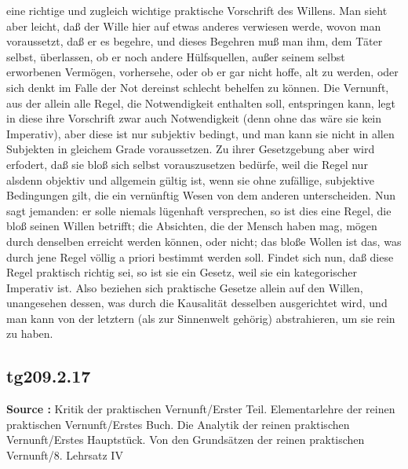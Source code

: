 \documentclass[a4paper,12pt,twoside]{book}
\begin{document}
eine richtige und zugleich wichtige praktische Vorschrift des Willens. Man sieht aber leicht, daß der Wille hier auf etwas anderes verwiesen werde, wovon man voraussetzt, daß er es begehre, und dieses Begehren muß man ihm, dem Täter selbst, überlassen, ob er noch andere Hülfsquellen, außer seinem selbst erworbenen Vermögen, vorhersehe, oder ob er gar nicht hoffe, alt zu werden, oder sich denkt im Falle der Not dereinst schlecht behelfen zu können. Die Vernunft, aus der allein alle Regel, die Notwendigkeit enthalten soll, entspringen kann, legt in diese ihre Vorschrift zwar auch Notwendigkeit (denn ohne das wäre sie kein Imperativ), aber diese ist nur subjektiv bedingt, und man kann sie nicht in allen Subjekten in gleichem Grade voraussetzen. Zu ihrer Gesetzgebung aber wird erfodert, daß sie bloß sich selbst vorauszusetzen bedürfe, weil die Regel nur alsdenn objektiv und allgemein gültig ist, wenn sie ohne zufällige, subjektive Bedingungen gilt, die ein vernünftig Wesen von dem anderen unterscheiden. Nun sagt jemanden: er solle niemals lügenhaft versprechen, so ist dies eine Regel, die bloß seinen Willen betrifft; die Absichten, die der Mensch haben mag, mögen durch denselben erreicht werden können, oder nicht; das bloße Wollen ist das, was durch jene Regel völlig a priori bestimmt werden soll. Findet sich nun, daß diese Regel praktisch richtig sei, so ist sie ein Gesetz, weil sie ein kategorischer Imperativ ist. Also beziehen sich praktische Gesetze allein auf den Willen, unangesehen dessen, was durch die Kausalität desselben ausgerichtet wird, und man kann von der letztern (als zur Sinnenwelt gehörig) abstrahieren, um sie rein zu haben. 
	
	\subsection*{tg209.2.17} 
	\textbf{Source : }Kritik der praktischen Vernunft/Erster Teil. Elementarlehre der reinen praktischen Vernunft/Erstes Buch. Die Analytik der reinen praktischen Vernunft/Erstes Hauptstück. Von den Grundsätzen der reinen praktischen Vernunft/8. Lehrsatz IV\\  
	
\end{document}
